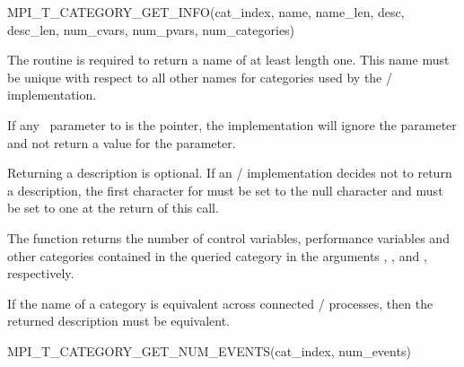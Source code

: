 \begin{funcdef}{MPI\_T\_CATEGORY\_GET\_INFO}{(\mbox{cat\_index}, \mbox{name}, \mbox{name\_len}, \mbox{desc}, \mbox{desc\_len}, \mbox{num\_cvars}, \mbox{num\_pvars}, \mbox{num\_categories})}
\end{funcdef}


The routine is required to return a name of at least length one.  This name
must be unique with respect to all other names for categories used by the
\MPI/ implementation.

If any \OUT\ parameter to  is the
 pointer, the implementation will ignore the parameter and not
return a value for the parameter.



Returning a description is optional.  If an \mpi/ implementation decides
not to return a description, the first character for  must be
set to the null character and  must be set to one at the
return of this call.

The function returns the number of control variables, performance variables
and other categories contained in the queried category in the arguments
, , and ,
respectively.

If the name of a category is equivalent across connected \MPI/ processes, then
the returned description must be equivalent.

\begin{funcdef}{MPI\_T\_CATEGORY\_GET\_NUM\_EVENTS}{(\mbox{cat\_index}, \mbox{num\_events})}
\end{funcdef}

